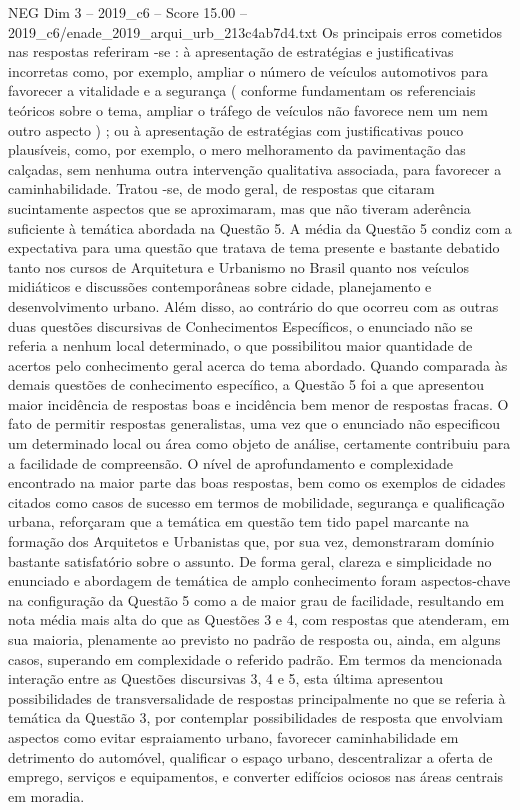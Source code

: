 \begin{textsample}{NEG Dim 3 – 2019\_c6 – Score 15.00 – 2019\_c6/enade\_2019\_arqui\_urb\_213c4ab7d4.txt}
Os principais erros cometidos nas respostas referiram -se : à apresentação de estratégias e justificativas incorretas como, por exemplo, ampliar o número de veículos automotivos para favorecer a vitalidade e a segurança ( conforme fundamentam os referenciais teóricos sobre o tema, ampliar o tráfego de veículos não favorece nem um nem outro aspecto ) ; ou à apresentação de estratégias com justificativas pouco plausíveis, como, por exemplo, o mero melhoramento da pavimentação das calçadas, sem nenhuma outra intervenção qualitativa associada, para favorecer a caminhabilidade.
Tratou -se, de modo geral, de respostas que citaram sucintamente aspectos que se aproximaram, mas que não tiveram aderência suficiente à temática abordada na Questão 5.
A média da Questão 5 condiz com a expectativa para uma questão que tratava de tema presente e bastante debatido tanto nos cursos de Arquitetura e Urbanismo no Brasil quanto nos veículos midiáticos e discussões contemporâneas sobre cidade, planejamento e desenvolvimento urbano.
Além disso, ao contrário do que ocorreu com as outras duas questões discursivas de Conhecimentos Específicos, o enunciado não se referia a nenhum local determinado, o que possibilitou maior quantidade de acertos pelo conhecimento geral acerca do tema abordado.
Quando comparada às demais questões de conhecimento específico, a Questão 5 foi a que apresentou maior incidência de respostas boas e incidência bem menor de respostas fracas.
O fato de permitir respostas generalistas, uma vez que o enunciado não especificou um determinado local ou área como objeto de análise, certamente contribuiu para a facilidade de compreensão.
O nível de aprofundamento e complexidade encontrado na maior parte das boas respostas, bem como os exemplos de cidades citados como casos de sucesso em termos de mobilidade, segurança e qualificação urbana, reforçaram que a temática em questão tem tido papel marcante na formação dos Arquitetos e Urbanistas que, por sua vez, demonstraram domínio bastante satisfatório sobre o assunto.
De forma geral, clareza e simplicidade no enunciado e abordagem de temática de amplo conhecimento foram aspectos-chave na configuração da Questão 5 como a de maior grau de facilidade, resultando em nota média mais alta do que as Questões 3 e 4, com respostas que atenderam, em sua maioria, plenamente ao previsto no padrão de resposta ou, ainda, em alguns casos, superando em complexidade o referido padrão.
Em termos da mencionada interação entre as Questões discursivas 3, 4 e 5, esta última apresentou possibilidades de transversalidade de respostas principalmente no que se referia à temática da Questão 3, por contemplar possibilidades de resposta que envolviam aspectos como evitar espraiamento urbano, favorecer caminhabilidade em detrimento do automóvel, qualificar o espaço urbano, descentralizar a oferta de emprego, serviços e equipamentos, e converter edifícios ociosos nas áreas centrais em moradia.

\end{textsample}
